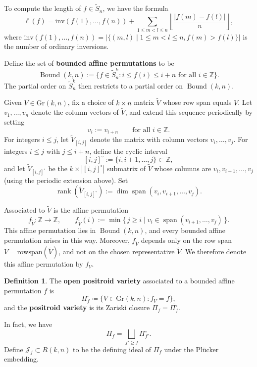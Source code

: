 \documentclass[12pt,reqno]{amsart}
\theoremstyle{definition}
\newtheorem{definition}[lemma]{Definition}
\newcommand{\Span}{\operatorname{span}}
\newcommand{\rank}{\operatorname{rank}}
\newcommand{\cJ}{\mathcal{J}}
\newcommand{\ZZ}{\mathbb{Z}}
\def\ZZ{{\mathbb Z}}
\newcommand{\gr}{\mathrm{Gr}}
\newcommand{\bound}{\operatorname{Bound}}
\begin{document}
{To compute the length of $f\in \widetilde{S}_n$, we have the formula
    \[
    \ell(f)=\mathrm{inv}(f(1),\ldots , f(n))+\sum_{1\leq m < l \leq n} \left\lfloor \frac{|f(m)-f(l)|}{n} \right\rfloor,
    \]
    where $\mathrm{inv}(f(1),\ldots , f(n))=|\{ (m,l) \;|\; 1\leq m < l \leq n, f(m)>f(l) \}|$ is the number of ordinary inversions.
    
Define the set of \textbf{bounded affine permutations} to be  
\begin{equation}\label{eqn:bounded}
        \bound(k,n) := \{f\in \widetilde{S}_n^k: i\leq f(i)\leq  i+n \text{ for all $i\in \ZZ$}
        \}.
\end{equation}
The partial order on $\widetilde{S}_n^k$ then restricts to a partial order on $\bound(k,n)$.



Given \(V\in \gr(k,n)\), fix a choice of \(k\times n\) matrix \(\widetilde{V}\) whose row span equals \(V\).
Let \(v_1,\dots,v_n\) denote the column vectors of \(\widetilde{V}\), and extend this sequence periodically by setting
\[
v_i := v_{i+n} \qquad \text{for all } i\in \mathbb{Z}.
\]
For integers \(i\le j\), let \(\widetilde{V}_{[i,j]}\) denote the matrix with column vectors \(v_i,\dots,v_j\).
For integers $i\le j$ with $j\le i+n$, define the cyclic interval
\[
[i,j]^\circ := \{i,i+1,\dots,j\}\subset \mathbb Z,
\]
and let $\widetilde V_{[i,j]^\circ}$ be the $k\times |[i,j]^\circ|$ submatrix of $\widetilde V$ whose columns are $v_i,v_{i+1},\dots,v_j$ (using the periodic extension above).
Set
\[
\rank(\widetilde V_{[i,j]^\circ}) := \dim \Span(v_i,v_{i+1},\dots,v_j).
\]


Associated to \(\widetilde{V}\) is the affine permutation
\begin{equation}\label{eqn:f_V}
f_{\widetilde{V}}:\mathbb{Z}\to\mathbb{Z}, \qquad
f_{\widetilde{V}}(i) := \min\{\, j\ge i \mid v_i \in \Span(v_{i+1},\dots,v_j) \,\}.
\end{equation}
This affine permutation lies in \(\bound(k,n)\), and every bounded affine permutation arises in this way.
Moreover, \(f_{\widetilde{V}}\) depends only on the row span \(V=\mathrm{rowspan}(\widetilde{V})\), and not on the chosen representative \(\widetilde{V}\).
We therefore denote this affine permutation by \(f_V\).


\begin{definition}\label{def:positroid-baf}
The \textbf{open positroid variety }associated to a bounded affine permutation $f$ is
\[\Pi_{f}^\circ \coloneqq \{V\in \gr(k,n):f_V = f\},\]
and the \textbf{positroid variety} is its Zariski closure
$\Pi_f = \overline{\Pi_f^{\circ}}$. 
\end{definition}
In fact, we have
\[\Pi_f = \bigsqcup_{f'\geq f}\Pi_{f'}^\circ.\]
Define $\cJ_f\subset R(k,n)$ to be the defining ideal of $\Pi_f$ under the Pl\"ucker embedding.

}
\end{document}
